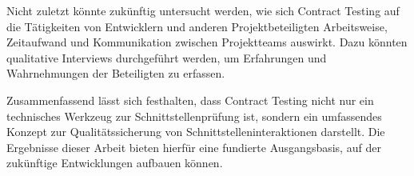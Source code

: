 Nicht zuletzt könnte zukünftig untersucht werden, wie sich Contract Testing auf die Tätigkeiten von Entwicklern und anderen Projektbeteiligten \bzgl Arbeitsweise, Zeitaufwand und Kommunikation zwischen Projektteams auswirkt.
Dazu könnten qualitative Interviews durchgeführt werden, um Erfahrungen und Wahrnehmungen der Beteiligten zu erfassen.

Zusammenfassend lässt sich festhalten, dass Contract Testing nicht nur ein technisches Werkzeug zur Schnittstellenprüfung ist, sondern ein umfassendes Konzept zur Qualitätssicherung von Schnittstelleninteraktionen darstellt.
Die Ergebnisse dieser Arbeit bieten hierfür eine fundierte Ausgangsbasis, auf der zukünftige Entwicklungen aufbauen können.

